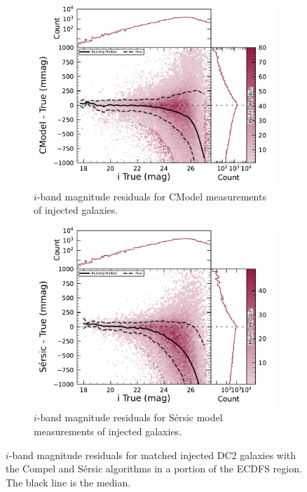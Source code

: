 \begin{figure}[hbt!]
  \centering
  \begin{subfigure}[t]{0.45\textwidth}
  \includegraphics[width=\linewidth]{injected_lsst_cells_v1_5063_i_mag_cmodel}
  \caption{$i$-band magnitude residuals for CModel measurements of injected galaxies.}
  \end{subfigure}\hfill
  \begin{subfigure}[t]{0.45\textwidth}
  \includegraphics[width=\linewidth]{injected_lsst_cells_v1_5063_i_mag_sersic}
  \caption{$i$-band magnitude residuals for S\'ersic model measurements of injected galaxies.}
  \end{subfigure}\hfill
\caption{$i$-band magnitude residuals for matched injected DC2 galaxies with the Compel and S\'ersic algorithms in a portion of the \gls{ECDFS} region. 
The black line is the median.}
\label{fig:injected_lsst_cells_v1_5063_i_mag}
\end{figure}
